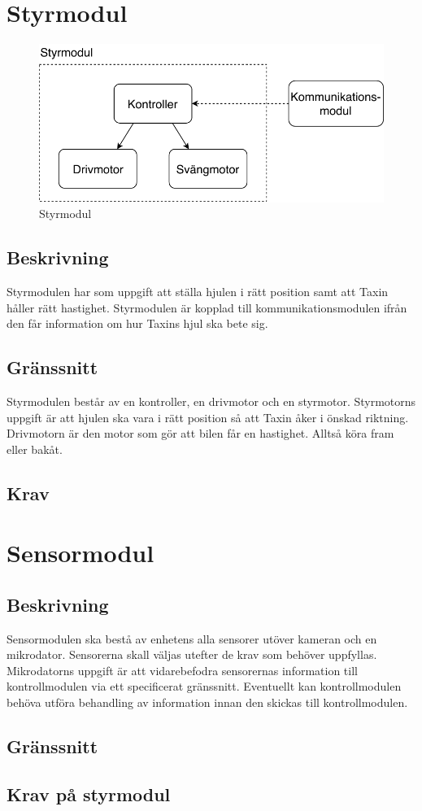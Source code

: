 \documentclass[kravspec/krav.tex]{subfiles}
\begin{document}
\section{Styrmodul}
\begin{figure}[h]
    \centering
    \includegraphics[width=0.6\linewidth]{kravspec/figures/styrmodul.pdf}
    \caption{Styrmodul}
    \label{fig:styrmodul}
\end{figure}

\subsection{Beskrivning}
Styrmodulen har som uppgift att ställa hjulen i rätt position samt att Taxin
håller rätt hastighet. Styrmodulen är kopplad till kommunikationsmodulen ifrån
den får information om hur Taxins hjul ska bete sig.

\subsection{Gränssnitt}
Styrmodulen består av en kontroller, en drivmotor och en styrmotor. Styrmotorns
uppgift är att hjulen ska vara i rätt position så att Taxin åker i önskad
riktning. Drivmotorn är den motor som gör att bilen får en hastighet. Alltså
köra fram eller bakåt.

\subsection{Krav}
\begin{reqlist}
    \req{}
\end{reqlist}

\clearpage
\section{Sensormodul}
\subsection{Beskrivning}
Sensormodulen ska bestå av enhetens alla sensorer utöver kameran och en
mikrodator. Sensorerna skall väljas utefter de krav som behöver uppfyllas.
Mikrodatorns uppgift är att vidarebefodra sensorernas information till
kontrollmodulen via ett specificerat gränssnitt. Eventuellt kan kontrollmodulen
behöva utföra behandling av information innan den skickas till kontrollmodulen.

\subsection{Gränssnitt}
\subsection{Krav på styrmodul}
\end{document}
